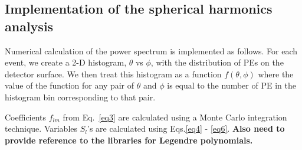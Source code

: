 \subsection{Implementation of the spherical harmonics analysis}

Numerical calculation of the power spectrum is implemented as follows.
For each event, we create a 2-D histogram, $\theta$ vs $\phi$, with the distribution of PEs on the detector surface. We then treat this 
histogram as a function $f(\theta,\phi)$ where the value of the function for any pair of $\theta$ and $\phi$ is equal to the number of 
PE in the histogram bin corresponding to that pair.

Coefficients $f_{lm}$ from Eq.~\ref{eq3} are calculated using a Monte Carlo integration technique. Variables $S_l$'s are calculated using 
Eqs.\ref{eq4} - \ref{eq6}. {\bf Also need to provide reference to the libraries for Legendre polynomials.}

